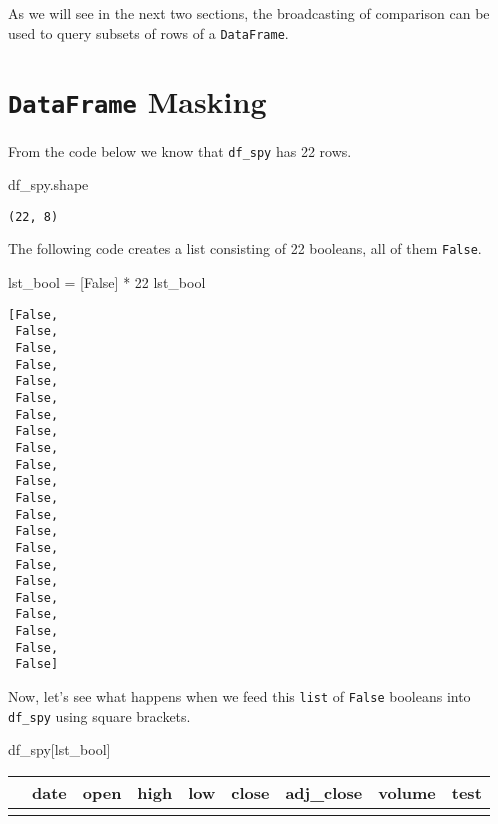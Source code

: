 \documentclass[
  letterpaper,
  DIV=11,
  numbers=noendperiod]{scrreprt}
\newenvironment{Shaded}{\begin{snugshade}}{\end{snugshade}}
\newcommand{\DecValTok}[1]{\textcolor[rgb]{0.68,0.00,0.00}{#1}}
\newcommand{\NormalTok}[1]{\textcolor[rgb]{0.00,0.23,0.31}{#1}}
\newcommand{\OperatorTok}[1]{\textcolor[rgb]{0.37,0.37,0.37}{#1}}
\newcommand{\VariableTok}[1]{\textcolor[rgb]{0.07,0.07,0.07}{#1}}
\begin{document}
As we will see in the next two sections, the broadcasting of comparison
can be used to query subsets of rows of a \texttt{DataFrame}.

\hypertarget{dataframe-masking}{%
\section{\texorpdfstring{\texttt{DataFrame}
Masking}{DataFrame Masking}}\label{dataframe-masking}}

From the code below we know that \texttt{df\_spy} has 22 rows.

\begin{Shaded}
\begin{Highlighting}[]
\NormalTok{df\_spy.shape}
\end{Highlighting}
\end{Shaded}

\begin{verbatim}
(22, 8)
\end{verbatim}

The following code creates a list consisting of 22 booleans, all of them
\texttt{False}.

\begin{Shaded}
\begin{Highlighting}[]
\NormalTok{lst\_bool }\OperatorTok{=}\NormalTok{ [}\VariableTok{False}\NormalTok{] }\OperatorTok{*} \DecValTok{22}
\NormalTok{lst\_bool}
\end{Highlighting}
\end{Shaded}

\begin{verbatim}
[False,
 False,
 False,
 False,
 False,
 False,
 False,
 False,
 False,
 False,
 False,
 False,
 False,
 False,
 False,
 False,
 False,
 False,
 False,
 False,
 False,
 False]
\end{verbatim}

Now, let's see what happens when we feed this \texttt{list} of
\texttt{False} booleans into \texttt{df\_spy} using square brackets.

\begin{Shaded}
\begin{Highlighting}[]
\NormalTok{df\_spy[lst\_bool]}
\end{Highlighting}
\end{Shaded}

\begin{longtable}[]{@{}lllllllll@{}}
\toprule\noalign{}
& date & open & high & low & close & adj\_close & volume & test \\
\midrule\noalign{}
\endhead
\bottomrule\noalign{}
\endlastfoot
\end{longtable}
\end{document}
